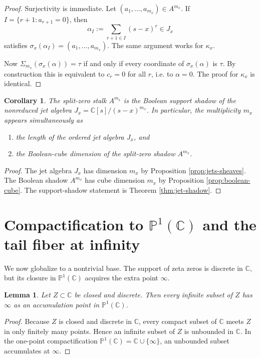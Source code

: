 \documentclass[11pt,a4paper]{article}
\newtheorem{lemma}[theorem]{Lemma}
\newtheorem{corollary}[theorem]{Corollary}
\theoremstyle{definition}
\theoremstyle{remark}
\newcommand{\CC}{\mathbb C}
\newcommand{\PP}{\mathbb P}
\newcommand{\taup}{\tau}
\begin{document}
\begin{proof}
Surjectivity is immediate.  Let $(a_1,\dots,a_{m_x})\in A^{m_x}$.  If $I=\{r+1:a_{r+1}=0\}$, then
\[
\alpha_I:=\sum_{r+1\in I}(s-x)^r\in J_x
\]
satisfies $\sigma_x(\alpha_I)=(a_1,\dots,a_{m_x})$.  The same argument works for $\kappa_x$.

Now $\Sigma_{m_x}(\sigma_x(\alpha))=\taup$ if and only if every coordinate of $\sigma_x(\alpha)$ is $\taup$.  By construction this is equivalent to $c_r=0$ for all $r$, i.e. to $\alpha=0$.  The proof for $\kappa_x$ is identical.
\end{proof}

\begin{corollary}\label{cor:boolean-shadow-nonreduced}
The split-zero stalk $A^{m_x}$ is the Boolean support shadow of the nonreduced jet algebra $J_x=\CC[s]/(s-x)^{m_x}$.  In particular, the multiplicity $m_x$ appears simultaneously as
\begin{enumerate}[label=(\roman*)]
\item the length of the ordered jet algebra $J_x$, and
\item the Boolean-cube dimension of the split-zero shadow $A^{m_x}$.
\end{enumerate}
\end{corollary}

\begin{proof}
The jet algebra $J_x$ has dimension $m_x$ by Proposition \ref{prop:jets-sheaves}.  The Boolean shadow $A^{m_x}$ has cube dimension $m_x$ by Proposition \ref{prop:boolean-cube}.  The support-shadow statement is Theorem \ref{thm:jet-shadow}.
\end{proof}

\section{Compactification to \texorpdfstring{$\PP^1(\CC)$}{P1(C)} and the tail fiber at infinity}

We now globalize to a nontrivial base.  The support of zeta zeros is discrete in $\CC$, but its closure in $\PP^1(\CC)$ acquires the extra point $\infty$.

\begin{lemma}\label{lem:infinite-subset-infty}
Let $Z\subset\CC$ be closed and discrete.  Then every infinite subset of $Z$ has $\infty$ as an accumulation point in $\PP^1(\CC)$.
\end{lemma}

\begin{proof}
Because $Z$ is closed and discrete in $\CC$, every compact subset of $\CC$ meets $Z$ in only finitely many points.  Hence an infinite subset of $Z$ is unbounded in $\CC$.  In the one-point compactification $\PP^1(\CC)=\CC\cup\{\infty\}$, an unbounded subset accumulates at $\infty$.
\end{proof}
\end{document}
